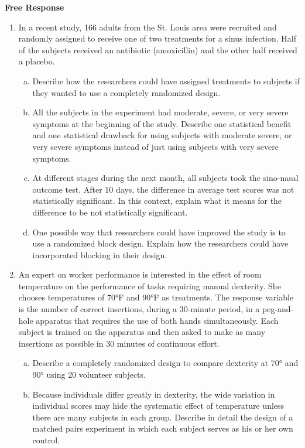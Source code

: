 \documentclass[a4paper,12pt,twoside]{book}
\begin{document}
\newpage

\textbf{Free Response}\vspace{0.3cm}

\begin{enumerate}
\item In a recent study, 166 adults from the St. Louis area were recruited and randomly assigned to receive one of two treatments for a sinus infection. Half of the subjects received an antibiotic (amoxicillin) and the other half received a placebo.
   \begin{enumerate}[(a)]
        \item Describe how the researchers could have assigned treatments to subjects if they wanted to use a completely randomized design.
        \item All the subjects in the experiment had moderate, severe, or very severe symptoms at the beginning of the study. Describe one statistical benefit and one statistical drawback for using subjects with moderate severe, or very severe symptoms instead of just using subjects with very severe symptoms.
        \item At different stages during the next month, all subjects took the sino-nasal outcome test. After 10 days, the difference in average test scores was not statistically significant. In this context, explain what it means for the difference to be not statistically significant. 
        \item One possible way that researchers could have improved the study is to use a randomized block design. Explain how the researchers could have incorporated blocking in their design.  
   \end{enumerate}
   \newpage
   
 \item  An expert on worker performance is interested in the effect of room temperature on the performance of tasks requiring manual dexterity. She chooses temperatures of 70\si{\degree}F and 90\si{\degree}F as treatments. The response variable is the number of correct insertions, during a 30-minute period, in a peg-and-hole apparatus that requires the use of both hands simultaneously. Each subject is trained on the apparatus and then asked to make as many insertions as possible in 30 minutes of continuous effort. 
 \begin{enumerate}[(a)]
     \item Describe a completely randomized design to compare dexterity at 70\si{\degree} and 90\si{\degree} using 20 volunteer subjects.
     \item Because individuals differ greatly in dexterity, the wide variation in individual scores may hide the systematic effect of temperature unless there are many subjects in each group. Describe in detail the design of a matched pairs experiment in which each subject serves as his or her own control.
 \end{enumerate}
\newpage


\end{enumerate}
\end{document}
